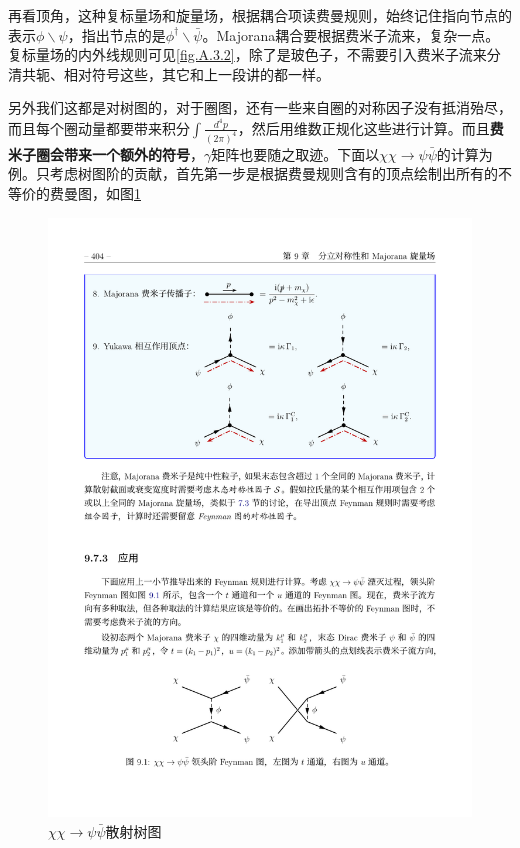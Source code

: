 再看顶角，这种复标量场和旋量场，根据耦合项读费曼规则，始终记住指向节点的表示$\phi\backslash\psi$，指出节点的是$\phi^{\dagger}\backslash\bar\psi$。Majorana耦合要根据费米子流来，复杂一点。复标量场的内外线规则可见\ref{fig.A.3.2}，除了是玻色子，不需要引入费米子流来分清共轭、相对符号这些，其它和上一段讲的都一样。

另外我们这都是对树图的，对于圈图，还有一些来自圈的对称因子没有抵消殆尽，而且每个圈动量都要带来积分$\int\frac{d^4p}{(2\pi)^4}$，然后用维数正规化这些进行计算。而且\textbf{费米子圈会带来一个额外的符号}，$\gamma$矩阵也要随之取迹。下面以$\chi\chi\to\psi\bar{\psi}$的计算为例。只考虑树图阶的贡献，首先第一步是根据费曼规则含有的顶点绘制出所有的不等价的费曼图，如图\ref{fig.A.3.3}
\begin{figure}[htbp]
	\centering
	\includegraphics{figs/fig21.pdf}
	\caption{$\chi\chi\to\psi\bar{\psi}$散射树图}
	\label{fig.A.3.3}
\end{figure}

